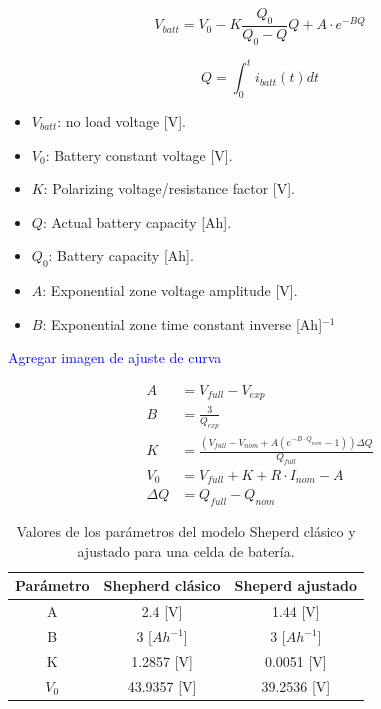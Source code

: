 \begin{equation}
    V_{batt} = V_0 -K\frac{Q_0}{Q_0-Q}Q + A\cdot e^{-BQ}
\label{eq:Voc}
\end{equation}

\begin{equation}
    Q = \int_0^t i_{batt}(t)dt
\end{equation}

\begin{itemize}
    \item $V_{batt}$: no load voltage [V].
    \item $V_{0}$: Battery constant voltage [V].
    \item $K$: Polarizing voltage/resistance factor [V].
    \item $Q$: Actual battery capacity [Ah].
    \item $Q_{0}$: Battery capacity [Ah].
    \item $A$: Exponential zone voltage amplitude [V].
    \item $B$: Exponential zone time constant inverse [Ah]${}^{-1}$
\end{itemize}

\textcolor{blue}{Agregar imagen de ajuste de curva}

\begin{equation}
\begin{split}
    A &= V_{full}-V_{exp}\\
    B &= \frac{3}{Q_{exp}}\\
    K &= \frac{(V_{full}-V_{nom}+A (e^{-B\cdot Q_{nom}}-1)) \Delta Q}{Q_{full}}\\
   V_0 &= V_{full} + K + R\cdot I_{nom} - A\\
    \Delta Q &=Q_{full}-Q_{nom}
\end{split}
\label{ecuaciones}
\end{equation}



\begin{table}[h]
\centering
\caption{Valores de los parámetros del modelo Sheperd clásico y ajustado para una celda de batería.}
\label{table3}
\begin{tabular}{c|c|c}\hline
Parámetro& Shepherd clásico & Sheperd ajustado\\ \hline \hline 
A& 2.4 [V]& 1.44 [V]\\
B & 3 [$Ah^{-1}$] & 3 [$Ah^{-1}$]\\
K & 1.2857 [V]& 0.0051 [V]\\
$V_0$ & 43.9357 [V]& 39.2536 [V]\\
\hline \hline
\end{tabular}
\end{table}



